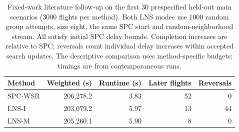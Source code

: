 \begin{table}[!htbp]
\caption{Fixed-work literature follow-up on the first 30 prespecified held-out main scenarios (3000 flights per method). Both LNS modes use 1000 random group attempts, size eight, the same SPC start and random-neighborhood stream. All satisfy initial SPC delay bounds. Completion increases are relative to SPC; reversals count individual delay increases within accepted search updates. The descriptive comparison uses method-specific budgets; timings are from contemporaneous runs.}\label{tab:confirmation-lns}
\centering\small
\begin{tabularx}{\textwidth}{L R R R R}
\toprule
Method & Weighted (s) & Runtime (s) & Later flights & Reversals \\
\midrule
SPC-WSR & 206,278.2 & 3.83 & 52 & 0 \\
LNS-I & 203,079.2 & 5.97 & 13 & 44 \\
LNS-M & 205,260.1 & 5.90 & 8 & 0 \\
\bottomrule
\end{tabularx}
\end{table}
